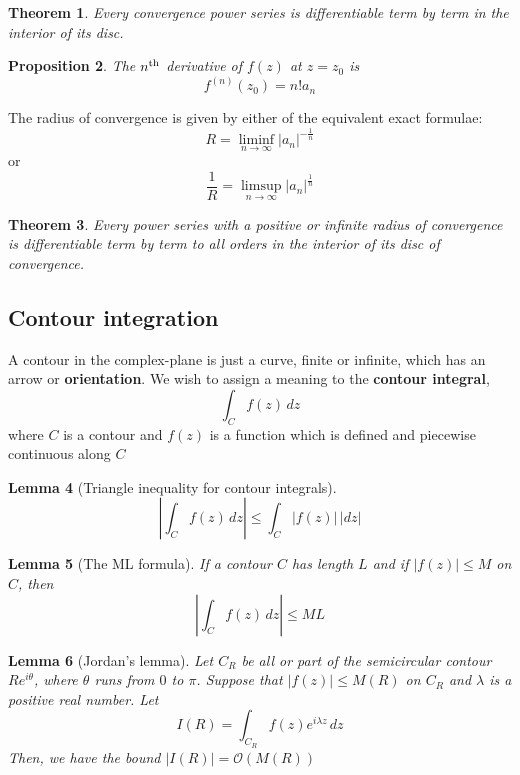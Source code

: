 \documentclass[10pt, oneside, reqno]{amsart}
\theoremstyle{plain}%
\newtheorem{thm}{Theorem}[section]
\newtheorem{lem}[thm]{Lemma}
\newtheorem{prop}[thm]{Proposition}
\theoremstyle{definition}
\theoremstyle{remark}
\newcommand{\dzz}{\, dz}
\newcommand{\bigo}[1]{\mathcal{O}(#1)}
\newcommand{\nth}{n\textsuperscript{th}}
\begin{document}
\begin{thm}
    Every convergence power series is differentiable term by term in the interior of its disc.
\end{thm}

\begin{prop}
    The $\nth$ derivative of $f(z)$ at $z = z_0$ is \[
        f^{(n)}(z_0)  =n! a_n
    \]
\end{prop}

The radius of convergence is given by either of the equivalent exact formulae:\[
    R = \liminf_{n \rightarrow \infty} |a_n|^{-\frac{1}{n}} 
\]
or \[
    \frac{1}{R} = \limsup_{n \rightarrow \infty} |a_n|^{\frac{1}{n}} 
\]

\begin{thm}
    Every power series with a positive or infinite radius of convergence is differentiable term by term to all orders in the interior of its disc of convergence.
\end{thm}



\subsection{Contour integration} %
\label{sec:contour_integration}

A contour in the complex-plane is just a curve, finite or infinite, which has an arrow or \textbf{orientation}.  We wish to assign a meaning to the \textbf{contour integral},\[
    \int_C f(z) \dzz
\]
where $C$ is a contour and $f(z)$ is a function which is defined and piecewise continuous along  $C$

\begin{lem}[Triangle inequality for contour integrals]
    \[
    \left| \int_C f(z) \dzz \right| \leq \int_C |f(z)| \, |dz|  
    \]
\end{lem}


\begin{lem}[The ML formula]
    If a contour $C$ has length $L$ and if $|f(z)| \leq M$ on $C$, then \[
        \left| \int_C f(z) \dzz \right| \leq ML
    \]
\end{lem}

\begin{lem}[Jordan's lemma]
    Let $C_R$ be all or part of the semicircular contour $Re^{i \theta}$, where $\theta$ runs from $0$ to $\pi$. Suppose that $|f(z)| \leq M(R)$ on $C_R$ and $\lambda$ is a positive real number.  Let \[
        I(R) = \int_{C_R} f(z) e^{i \lambda z} \dzz
    \]
    Then, we have the bound $|I(R)| = \bigo{M(R)}$
\end{lem}
\end{document}
